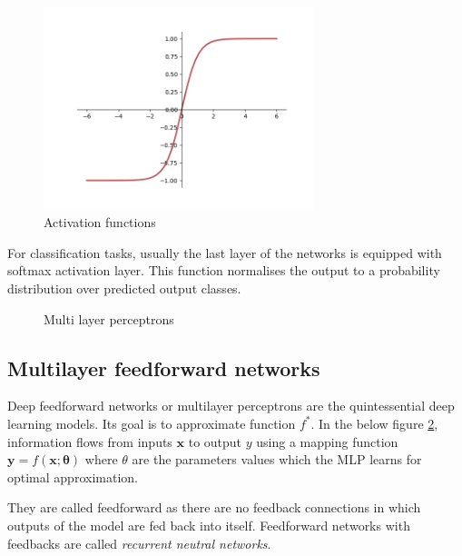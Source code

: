 \begin{figure}[h]
	\begin{center}
        \includegraphics[width=0.7\textwidth]{figures/png/tanhnew.png}%
	\end{center}
    \caption{Activation functions}
    \label{fig:activationfunctions3}
\end{figure}
\fi
For classification tasks, usually the last layer of the networks is equipped with softmax
activation layer. This function normalises the output to a probability distribution over
predicted output classes.

\begin{figure}[h]
    \def\svgwidth{0.7\textwidth}
	\begin{center}
    \end{center}
    \caption{Multi layer perceptrons}
    \label{fig:MLP}
\end{figure}

\subsection{Multilayer feedforward networks}
\label{subsec:MLP}
Deep feedforward networks or multilayer perceptrons are the quintessential deep learning
models. Its goal is to approximate function $f^*$. In the below figure \ref{fig:MLP},
information flows from inputs $\mathbf{x}$ to output $y$ using a mapping function
$\mathbf{y} = f(\mathbf{x};\mathbf{\theta})$ where $\theta$ are the parameters values
which the MLP learns for optimal approximation.

They are called feedforward as there are no feedback connections in which outputs of the
model are fed back into itself. Feedforward networks with feedbacks are called
\textit{recurrent neutral networks}.

